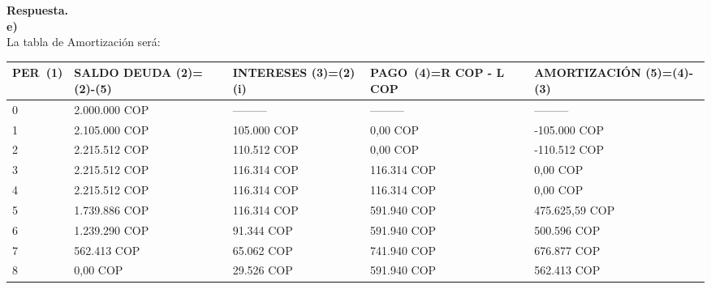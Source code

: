 \textbf{Respuesta.\\e)\\}
	La tabla de Amortización será: \\
	\begin{spacing}{1.1}
		\begin{center}
        \footnotesize
			\begin{tabular}{|p{1cm}|p{2.5cm}|p{2.5cm}|p{2cm}|p{3cm}|}
				\hline
				\textbf{PER\ (1)} & \textbf{SALDO DEUDA (2)=(2)-(5)} & \textbf{INTERESES  (3)=(2)(i)} & \textbf{PAGO\ (4)=R  COP  -  L  COP} & \textbf{AMORTIZACIÓN  (5)=(4)-(3)} \\ \hline
				
				0                 &  2.000.000 COP                      & ---------                       & ---------                       & ---------                          \\ \hline
				1                 &  2.105.000  COP                      &  105.000  COP                   &  0,00  COP                    &    -105.000  COP                    \\ \hline
				2                 &  2.215.512  COP                      &  110.512  COP                   &  0,00  COP                    &    -110.512  COP                   \\ \hline
				3                 &  2.215.512  COP                      &  116.314  COP                  &  116.314  COP                  &    0,00  COP                           \\ \hline
				4                 &  2.215.512  COP                      &  116.314  COP                  &  116.314  COP                  &    0,00  COP                           \\ \hline
				5                 &  1.739.886  COP                       &  116.314  COP                  &  591.940  COP                 &    475.625,59   COP                    \\ \hline
				6                 &  1.239.290  COP                       &  91.344  COP                   &  591.940  COP                 &    500.596  COP                     \\ \hline
				7                 &  562.413  COP                        &   65.062  COP                   &  741.940  COP                 &    676.877   COP                   \\ \hline
				8                 &  0,00  COP                           &  29.526  COP                &    591.940  COP                   &    562.413   COP                    \\ \hline
			\end{tabular}
		\end{center}
	\end{spacing}

